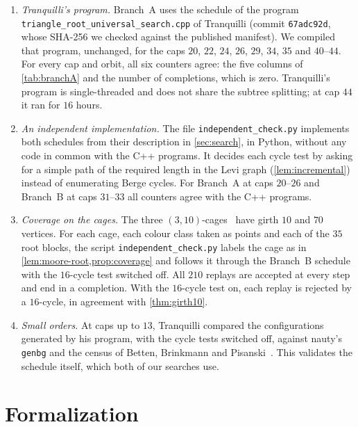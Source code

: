 \documentclass[11pt]{amsart}
\theoremstyle{definition}
\theoremstyle{remark}
\newcommand{\code}[1]{\texttt{#1}}
\begin{document}
\begin{enumerate}[leftmargin=2em,label=(\alph*)]
\item \emph{Tranquilli's program.} Branch~A uses the schedule of the program
  \code{triangle\_root\_\allowbreak universal\_\allowbreak search.cpp} of
  Tranquilli (commit \code{67adc92d}, whose
  SHA-256 we checked against the published manifest). We compiled that program,
  unchanged, for the caps $20$, $22$, $24$, $26$, $29$, $34$, $35$ and
  $40$--$44$. For every cap and
  orbit, all six counters agree: the five columns of \cref{tab:branchA} and the
  number of completions, which is zero. Tranquilli's program
  is single-threaded and does not share the subtree splitting; at cap $44$ it
  ran for $16$ hours.
\item \emph{An independent implementation.} The file
  \code{independent\_check.py} implements both schedules from their description
  in \cref{sec:search}, in Python, without any code in common with the C++
  programs. It decides each cycle test by asking for a simple path of the
  required length in the Levi graph (\cref{lem:incremental}) instead of
  enumerating Berge cycles. For Branch~A at caps $20$--$26$ and Branch~B at
  caps $31$--$33$ all counters agree with the C++ programs.
\item \emph{Coverage on the cages.} The three
  $(3,10)$-cages~\cite{OKeefeWong1980,Wong1983} have girth $10$ and $70$
  vertices. For each cage, each colour class taken as points and each of the
  $35$ root blocks, the script \code{independent\_check.py} labels
  the cage as in \cref{lem:moore-root,prop:coverage} and follows it through the
  Branch~B schedule with the $16$-cycle test switched off. All $210$ replays are
  accepted at every step and end in a completion. With the $16$-cycle test on,
  each replay is rejected by a $16$-cycle, in agreement with
  \cref{thm:girth10}.
\item \emph{Small orders.} At caps up to $13$, Tranquilli compared the
  configurations generated by his program, with the cycle tests switched off,
  against nauty's \code{genbg} and the census of Betten, Brinkmann and
  Pisanski~\cite[§4]{Tranquilli2026}. This validates the schedule itself, which
  both of our searches use.
\end{enumerate}

\section{Formalization}\label{sec:lean}
\end{document}
